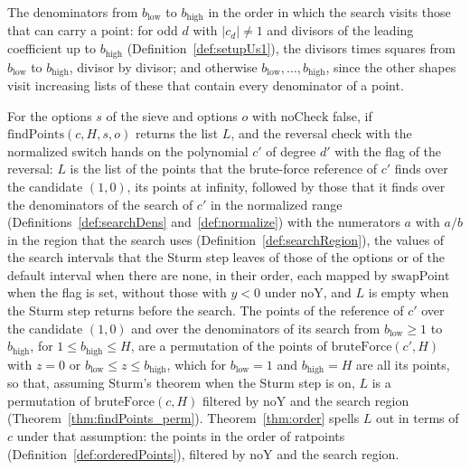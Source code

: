 \begin{definition}\label{def:searchDens}
  \leanok
  The denominators from $b_{\mathrm{low}}$ to $b_{\mathrm{high}}$ in the order in which the search
  visits those that can carry a point: for odd $d$ with $|c_d| \ne 1$ and divisors of the leading
  coefficient up to $b_{\mathrm{high}}$ (Definition~\ref{def:setupUs1}), the divisors times squares
  from $b_{\mathrm{low}}$ to $b_{\mathrm{high}}$, divisor by divisor; and otherwise
  $b_{\mathrm{low}}, \dots, b_{\mathrm{high}}$, since the other shapes visit increasing lists of
  these that contain every denominator of a point.
\end{definition}

\begin{theorem}\label{thm:findPoints_order}
  \leanok
  For the options $s$ of the sieve and options $o$ with $\mathrm{noCheck}$ false, if
  $\mathrm{findPoints}(c, H, s, o)$ returns the list $L$, and the reversal check with the normalized
  switch hands on the polynomial $c'$ of degree $d'$ with the flag of the reversal: $L$ is the list
  of the points that the brute-force reference of $c'$ finds over the candidate $(1, 0)$, its points
  at infinity, followed by those that it finds over the denominators of the search of $c'$ in the
  normalized range (Definitions~\ref{def:searchDens} and~\ref{def:normalize}) with the numerators
  $a$ with $a/b$ in the region that the search uses (Definition~\ref{def:searchRegion}), the values
  of the search intervals that the Sturm step leaves of those of the options or of the default
  interval when there are none, in their order, each mapped by $\mathrm{swapPoint}$ when the flag is
  set, without those with $y < 0$ under $\mathrm{noY}$, and $L$ is empty when the Sturm step returns
  before the search. The points of the reference of $c'$ over the candidate $(1, 0)$ and over the
  denominators of its search from $b_{\mathrm{low}} \ge 1$ to $b_{\mathrm{high}}$, for
  $1 \le b_{\mathrm{high}} \le H$, are a permutation of the points of $\mathrm{bruteForce}(c', H)$
  with $z = 0$ or $b_{\mathrm{low}} \le z \le b_{\mathrm{high}}$, which for $b_{\mathrm{low}} = 1$
  and $b_{\mathrm{high}} = H$ are all its points, so that, assuming Sturm's theorem when the Sturm
  step is on, $L$ is a permutation of $\mathrm{bruteForce}(c, H)$ filtered by $\mathrm{noY}$ and the
  search region (Theorem~\ref{thm:findPoints_perm}). Theorem~\ref{thm:order} spells $L$ out in terms
  of $c$ under that assumption: the points in the order of ratpoints
  (Definition~\ref{def:orderedPoints}), filtered by $\mathrm{noY}$ and the search region.
\end{theorem}

